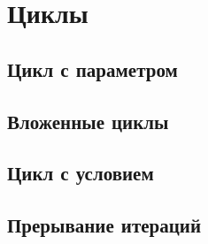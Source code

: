 \section{Циклы}

\subsection{Цикл с параметром}

\subsection{Вложенные циклы}

\subsection{Цикл с условием}

\subsection{Прерывание итераций}
